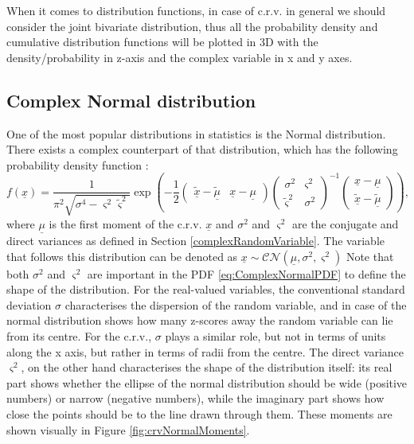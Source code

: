 \documentclass[
]{book}
\begin{document}
When it comes to distribution functions, in case of c.r.v. in general we should consider the joint bivariate distribution, thus all the probability density and cumulative distribution functions will be plotted in 3D with the density/probability in z-axis and the complex variable in x and y axes.

\hypertarget{distributionCNorm}{%
\subsection{Complex Normal distribution}\label{distributionCNorm}}

One of the most popular distributions in statistics is the Normal distribution. There exists a complex counterpart of that distribution, which has the following probability density function \citep{Wooding1956a}:
\begin{equation}
    f(\underline{x}) = \frac{1}{\pi^2 \sqrt{\sigma^4 - \varsigma^2 \tilde{\varsigma}^2}} \exp\left(- \frac{1}{2}
        \begin{pmatrix} \underline{\tilde{x}} - \underline{\tilde{\mu}} & \underline{x} - \underline{\mu} \end{pmatrix}
        \begin{pmatrix} \sigma^2 & \varsigma^2 \\ \tilde{\varsigma}^2 & \sigma^2 \end{pmatrix}^{-1}
        \begin{pmatrix} \underline{x} - \underline{\mu} \\ \underline{\tilde{x}} - \underline{\tilde{\mu}} \end{pmatrix}
    \right),
    \label{eq:ComplexNormalPDF}
\end{equation}
where \(\underline{\mu}\) is the first moment of the c.r.v. \(\underline{x}\) and \(\sigma^2\) and \(\varsigma^2\) are the conjugate and direct variances as defined in Section \ref{complexRandomVariable}. The variable that follows this distribution can be denoted as \(\underline{x} \sim \mathcal{CN}(\underline{\mu}, \sigma^2, \varsigma^2)\) Note that both \(\sigma^2\) and \(\varsigma^2\) are important in the PDF \eqref{eq:ComplexNormalPDF} to define the shape of the distribution. For the real-valued variables, the conventional standard deviation \(\sigma\) characterises the dispersion of the random variable, and in case of the normal distribution shows how many z-scores away the random variable can lie from its centre. For the c.r.v., \(\sigma\) plays a similar role, but not in terms of units along the x axis, but rather in terms of radii from the centre. The direct variance \(\varsigma^2\), on the other hand characterises the shape of the distribution itself: its real part shows whether the ellipse of the normal distribution should be wide (positive numbers) or narrow (negative numbers), while the imaginary part shows how close the points should be to the line drawn through them. These moments are shown visually in Figure \ref{fig:crvNormalMoments}.
\end{document}
